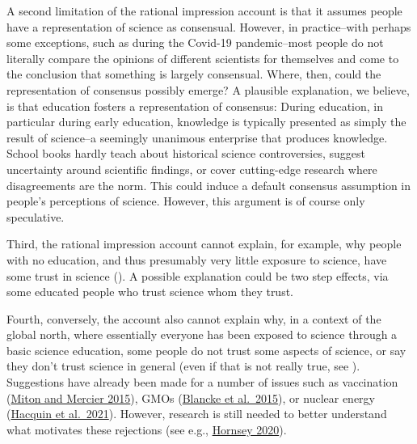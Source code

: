 \documentclass[
  jou,
  floatsintext,
  longtable,
  nolmodern,
  notxfonts,
  notimes,
  colorlinks=true,linkcolor=blue,citecolor=blue,urlcolor=blue]{apa7}
\begin{document}
A second limitation of the rational impression account is that it
assumes people have a representation of science as consensual. However,
in practice--with perhaps some exceptions, such as during the Covid-19
pandemic--most people do not literally compare the opinions of different
scientists for themselves and come to the conclusion that something is
largely consensual. Where, then, could the representation of consensus
possibly emerge? A plausible explanation, we believe, is that education
fosters a representation of consensus: During education, in particular
during early education, knowledge is typically presented as simply the
result of science--a seemingly unanimous enterprise that produces
knowledge. School books hardly teach about historical science
controversies, suggest uncertainty around scientific findings, or cover
cutting-edge research where disagreements are the norm. This could
induce a default consensus assumption in people's perceptions of
science. However, this argument is of course only speculative.

Third, the rational impression account cannot explain, for example, why
people with no education, and thus presumably very little exposure to
science, have some trust in science
(). A possible explanation could be two step
effects, via some educated people who trust science whom they trust.

Fourth, conversely, the account also cannot explain why, in a context of
the global north, where essentially everyone has been exposed to science
through a basic science education, some people do not trust some aspects
of science, or say they don't trust science in general (even if that is
not really true, see
). Suggestions have already been made for a
number of issues such as vaccination
(\href{https://janpfander.github.io/phd_thesis/references.html\#ref-mitonCognitiveObstaclesProVaccination2015}{Miton
and Mercier 2015}), GMOs
(\href{https://janpfander.github.io/phd_thesis/references.html\#ref-blanckeFatalAttractionIntuitive2015}{Blancke
et al.~2015}), or nuclear energy
(\href{https://janpfander.github.io/phd_thesis/references.html\#ref-hacquinDisgustSensitivityPublic2021}{Hacquin
et al.~2021}). However, research is still needed to better understand
what motivates these rejections (see e.g.,
\href{https://janpfander.github.io/phd_thesis/references.html\#ref-hornseyWhyFactsAre2020}{Hornsey
2020}).
\end{document}
